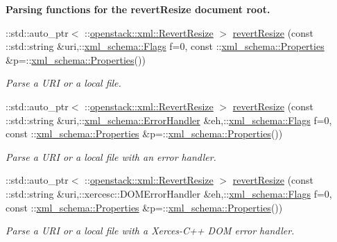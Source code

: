 \begin{Indent}{\bf Parsing functions for the revertResize document root.}\par
\begin{DoxyCompactItemize}
\item 
::std::auto\_\-ptr$<$ ::\hyperlink{classopenstack_1_1xml_1_1RevertResize}{openstack::xml::RevertResize} $>$ \hyperlink{namespaceopenstack_1_1xml_a377fc19a753ce18731d6a3615aaa9a8c}{revertResize} (const ::std::string \&uri,::\hyperlink{namespacexml__schema_affb4c227cbd9aa7453dd1dc5a1401943}{xml\_\-schema::Flags} f=0, const ::\hyperlink{namespacexml__schema_ad27ce19a7ee1d3b1064092648898f64c}{xml\_\-schema::Properties} \&p=::\hyperlink{namespacexml__schema_ad27ce19a7ee1d3b1064092648898f64c}{xml\_\-schema::Properties}())
\begin{DoxyCompactList}\small\item\em Parse a URI or a local file. \item\end{DoxyCompactList}\item 
::std::auto\_\-ptr$<$ ::\hyperlink{classopenstack_1_1xml_1_1RevertResize}{openstack::xml::RevertResize} $>$ \hyperlink{namespaceopenstack_1_1xml_abfdc69b983b152e0ae8f9d1c95bb9b8d}{revertResize} (const ::std::string \&uri,::\hyperlink{namespacexml__schema_ab1c9361bfd3b404eaabf0c31eded79dc}{xml\_\-schema::ErrorHandler} \&eh,::\hyperlink{namespacexml__schema_affb4c227cbd9aa7453dd1dc5a1401943}{xml\_\-schema::Flags} f=0, const ::\hyperlink{namespacexml__schema_ad27ce19a7ee1d3b1064092648898f64c}{xml\_\-schema::Properties} \&p=::\hyperlink{namespacexml__schema_ad27ce19a7ee1d3b1064092648898f64c}{xml\_\-schema::Properties}())
\begin{DoxyCompactList}\small\item\em Parse a URI or a local file with an error handler. \item\end{DoxyCompactList}\item 
::std::auto\_\-ptr$<$ ::\hyperlink{classopenstack_1_1xml_1_1RevertResize}{openstack::xml::RevertResize} $>$ \hyperlink{namespaceopenstack_1_1xml_a941aeee9019d5d76d1cca740d7e106f6}{revertResize} (const ::std::string \&uri,::xercesc::DOMErrorHandler \&eh,::\hyperlink{namespacexml__schema_affb4c227cbd9aa7453dd1dc5a1401943}{xml\_\-schema::Flags} f=0, const ::\hyperlink{namespacexml__schema_ad27ce19a7ee1d3b1064092648898f64c}{xml\_\-schema::Properties} \&p=::\hyperlink{namespacexml__schema_ad27ce19a7ee1d3b1064092648898f64c}{xml\_\-schema::Properties}())
\begin{DoxyCompactList}\small\item\em Parse a URI or a local file with a Xerces-\/C++ DOM error handler. \item\end{DoxyCompactList}\item 

\end{DoxyCompactItemize}
\end{Indent}
